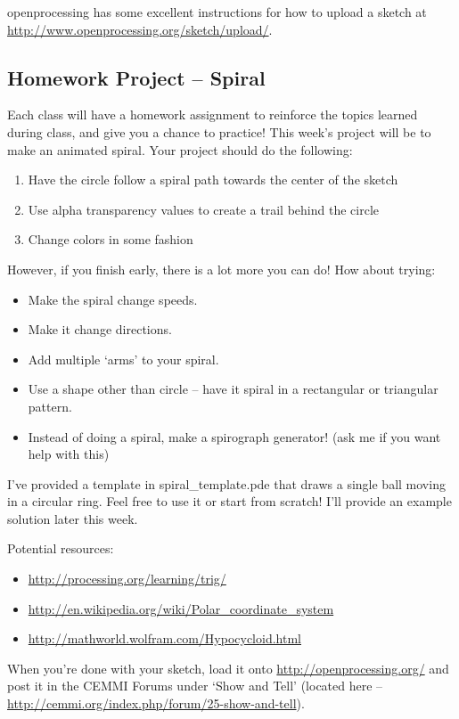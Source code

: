 openprocessing has some excellent instructions for how to upload a sketch at \url{http://www.openprocessing.org/sketch/upload/}.

\subsection{Homework Project -- Spiral}
Each class will have a homework assignment to reinforce the topics learned during class, and give you a chance to practice!  This week's project will be to make an animated spiral.  Your project should do the following:

\begin{enumerate}
\item Have the circle follow a spiral path towards the center of the sketch
\item Use alpha transparency values to create a trail behind the circle
\item Change colors in some fashion
\end{enumerate}

However, if you finish early, there is a lot more you can do!  How about trying:

\begin{itemize}
\item Make the spiral change speeds.
\item Make it change directions.
\item Add multiple `arms' to your spiral.
\item Use a shape other than circle -- have it spiral in a rectangular or triangular pattern.
\item Instead of doing a spiral, make a spirograph generator! (ask me if you want help with this)
\end{itemize}

I've provided a template in spiral\_template.pde that draws a single ball moving in a circular ring.  Feel free to use it or start from scratch!  I'll provide an example solution later this week.

Potential resources:
\begin{itemize}
\item \url{http://processing.org/learning/trig/}
\item \url{http://en.wikipedia.org/wiki/Polar_coordinate_system}
\item \url{http://mathworld.wolfram.com/Hypocycloid.html}
\end{itemize}

When you're done with your sketch, load it onto \url{http://openprocessing.org/} and post it in the CEMMI Forums under `Show and Tell' (located here -- \url{http://cemmi.org/index.php/forum/25-show-and-tell}).

